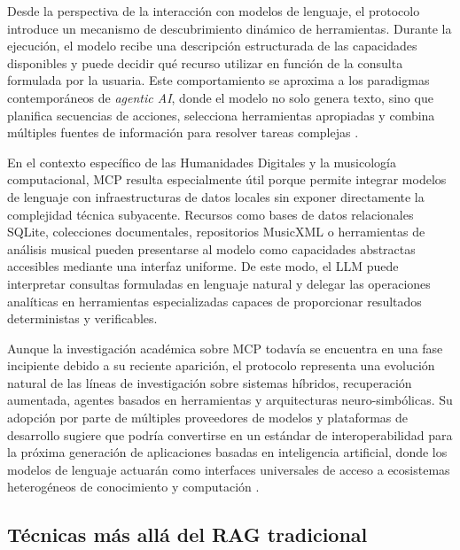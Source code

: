 Desde la perspectiva de la interacción con modelos de lenguaje, el protocolo introduce un mecanismo de descubrimiento dinámico de herramientas. Durante la ejecución, el modelo recibe una descripción estructurada de las capacidades disponibles y puede decidir qué recurso utilizar en función de la consulta formulada por la usuaria. Este comportamiento se aproxima a los paradigmas contemporáneos de \textit{agentic AI}, donde el modelo no solo genera texto, sino que planifica secuencias de acciones, selecciona herramientas apropiadas y combina múltiples fuentes de información para resolver tareas complejas \citep{yao2023react, wang2024surveyagents}.

En el contexto específico de las Humanidades Digitales y la musicología computacional, MCP resulta especialmente útil porque permite integrar modelos de lenguaje con infraestructuras de datos locales sin exponer directamente la complejidad técnica subyacente. Recursos como bases de datos relacionales SQLite, colecciones documentales, repositorios MusicXML o herramientas de análisis musical pueden presentarse al modelo como capacidades abstractas accesibles mediante una interfaz uniforme. De este modo, el LLM puede interpretar consultas formuladas en lenguaje natural y delegar las operaciones analíticas en herramientas especializadas capaces de proporcionar resultados deterministas y verificables.

Aunque la investigación académica sobre MCP todavía se encuentra en una fase incipiente debido a su reciente aparición, el protocolo representa una evolución natural de las líneas de investigación sobre sistemas híbridos, recuperación aumentada, agentes basados en herramientas y arquitecturas neuro-simbólicas. Su adopción por parte de múltiples proveedores de modelos y plataformas de desarrollo sugiere que podría convertirse en un estándar de interoperabilidad para la próxima generación de aplicaciones basadas en inteligencia artificial, donde los modelos de lenguaje actuarán como interfaces universales de acceso a ecosistemas heterogéneos de conocimiento y computación \citep{anthropic2024mcp}.

\subsection{Técnicas más allá del RAG tradicional}

